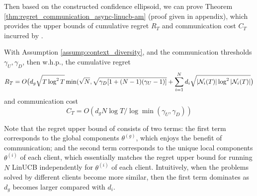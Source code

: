 Then based on the constructed confidence ellipsoid, we can prove Theorem \ref{thm:regret_communication_async-linucb-am} (proof given in appendix), which provides the upper bounds of cumulative regret $R_{T}$ and communication cost $C_{T}$ incurred by \modeltwo{}.
\begin{theorem} \label{thm:regret_communication_async-linucb-am}
With Assumption \ref{assump:context_diversity}, and the communication thresholds $\gamma_{U},\gamma_{D}$, then w.h.p., the cumulative regret $$R_{T} = O\bigl(d_{g}\sqrt{T\log^{2}{T}}\min(\sqrt{N},\sqrt{\gamma_{D} [1+(N-1)(\gamma_{U}-1)]} + \sum_{i=1}^{N} d_{i} \sqrt{|\mathcal{N}_{i}(T)|\log^{2}{|\mathcal{N}_{i}(T)|}}\bigr)$$ and communication cost $$C_{T}=O(d_{g} N\log{T}/\log{\min(\gamma_{U},\gamma_{D})})$$
\end{theorem}
Note that the regret upper bound of \modeltwo{} consists of two terms: the first term corresponds to the global components $\theta^{(g)}$, which enjoys the benefit of communication; and the second term corresponds to the unique local components $\theta^{(i)}$ of each client, which essentially matches the regret upper bound for running $N$ LinUCB independently for $\theta^{(i)}$ of each client. 
Intuitively, when the problems solved by different clients become more similar, then the first term dominates as $d_{g}$ becomes larger compared with $d_{i}$.


